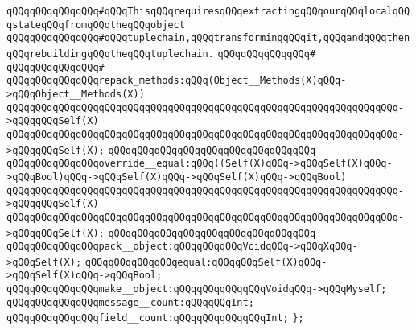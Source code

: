 \verb|qQQqqQQqqQQqqQQq#qQQqThisqQQqrequiresqQQqextractingqQQqourqQQqlocalqQQqstateqQQqfromqQQqtheqQQqobject|\newline
\verb|qQQqqQQqqQQqqQQq#qQQqtuplechain,qQQqtransformingqQQqit,qQQqandqQQqthenqQQqrebuildingqQQqtheqQQqtuplechain.|\newline
\verb|qQQqqQQqqQQqqQQq#|\newline
\verb|qQQqqQQqqQQqqQQq#|\newline
\verb|qQQqqQQqqQQqqQQqrepack_methods:qQQq(Object__Methods(X)qQQq->qQQqObject__Methods(X))|\newline
\verb|qQQqqQQqqQQqqQQqqQQqqQQqqQQqqQQqqQQqqQQqqQQqqQQqqQQqqQQqqQQqqQQqqQQq->qQQqqQQqSelf(X)|\newline
\verb|qQQqqQQqqQQqqQQqqQQqqQQqqQQqqQQqqQQqqQQqqQQqqQQqqQQqqQQqqQQqqQQqqQQq->qQQqqQQqSelf(X);|\newline
\verb|qQQqqQQqqQQqqQQqqQQqqQQqqQQqqQQqqQQq|\newline
\verb|qQQqqQQqqQQqqQQqoverride__equal:qQQq((Self(X)qQQq->qQQqSelf(X)qQQq->qQQqBool)qQQq->qQQqSelf(X)qQQq->qQQqSelf(X)qQQq->qQQqBool)|\newline
\verb|qQQqqQQqqQQqqQQqqQQqqQQqqQQqqQQqqQQqqQQqqQQqqQQqqQQqqQQqqQQqqQQqqQQq->qQQqqQQqSelf(X)|\newline
\verb|qQQqqQQqqQQqqQQqqQQqqQQqqQQqqQQqqQQqqQQqqQQqqQQqqQQqqQQqqQQqqQQqqQQq->qQQqqQQqSelf(X);|\newline
\verb|qQQqqQQqqQQqqQQqqQQqqQQqqQQqqQQqqQQq|\newline
\verb|qQQqqQQqqQQqqQQqpack__object:qQQqqQQqqQQqVoidqQQq->qQQqXqQQq->qQQqSelf(X);|\newline
\newline
\verb|qQQqqQQqqQQqqQQqequal:qQQqqQQqSelf(X)qQQq->qQQqSelf(X)qQQq->qQQqBool;|\newline
\newline
\verb|qQQqqQQqqQQqqQQqmake__object:qQQqqQQqqQQqqQQqVoidqQQq->qQQqMyself;|\newline
\newline
\verb|qQQqqQQqqQQqqQQqmessage__count:qQQqqQQqInt;|\newline
\verb|qQQqqQQqqQQqqQQqfield__count:qQQqqQQqqQQqqQQqInt;|\newline
\verb|};|\newline
\newline


